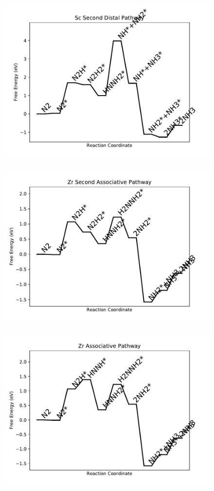 \begin{figure}
\includegraphics[width=0.8\linewidth]{data/plots/Sc_distal_2.pdf}
\end{figure}

\begin{figure}
\includegraphics[width=0.8\linewidth]{data/plots/Zr_associative_2.pdf}
\end{figure}

\begin{figure}
\includegraphics[width=0.8\linewidth]{data/plots/Zr_associative.pdf}
\end{figure}

